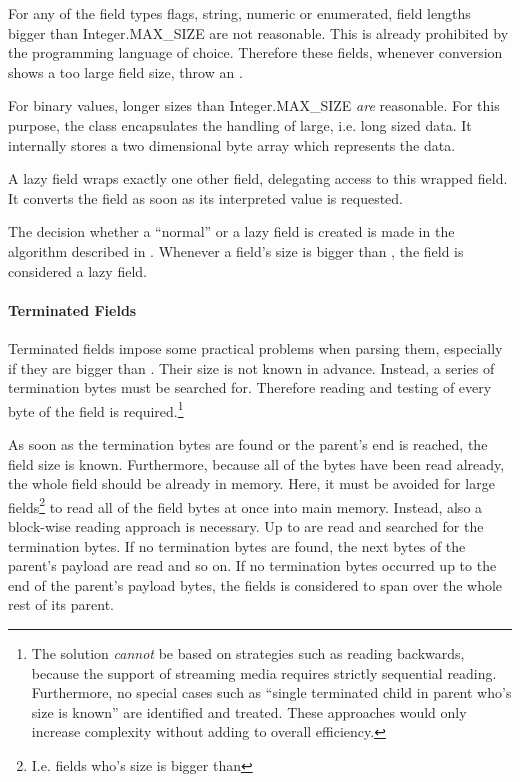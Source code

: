 For any of the field types flags, string, numeric or enumerated, field lengths bigger than Integer.MAX\_SIZE are not reasonable. This is already prohibited by the programming language of choice. Therefore these fields, whenever conversion shows a too large field size, throw an \CLASSfieldSizeOutOfRangeException{}.

For binary values, longer sizes than Integer.MAX\_SIZE \emph{are} reasonable. For this purpose, the \CLASSbinaryValue{} class encapsulates the handling of large, i.e. long sized data. It internally stores a two dimensional byte array which represents the data. 

A lazy field wraps exactly one other field, delegating access to this wrapped field. It converts the field as soon as its interpreted value is requested.

The decision whether a ``normal'' or a lazy field is created is made in the algorithm described in . Whenever a field's size is bigger than \CONSTfieldBlockSize{}, the field is considered a lazy field.


\paragraph{Terminated Fields}
\label{sec:TerminatedFieldsandLargePayload}

Terminated fields impose some practical problems when parsing them, especially if they are bigger than \CONSTfieldBlockSize{}. Their size is not known in advance. Instead, a series of termination bytes must be searched for. Therefore reading and testing of every byte of the field is required.\footnote{The solution \emph{cannot} be based on strategies such as reading backwards, because the support of streaming media requires strictly sequential reading. Furthermore, no special cases such as ``single terminated child in parent who's size is known'' are identified and treated. These approaches would only increase complexity without adding to overall efficiency.}

As soon as the termination bytes are found or the parent's end is reached, the field size is known. Furthermore, because all of the bytes have been read already, the whole field should be already in memory. Here, it must be avoided for large fields\footnote{I.e. fields who's size is bigger than \CONSTfieldBlockSize{}} to read all of the field bytes at once into main memory. Instead, also a block-wise reading approach is necessary. Up to \CONSTfieldBlockSize{} are read and searched for the termination bytes. If no termination bytes are found, the next bytes of the parent's payload are read and so on. If no termination bytes occurred up to the end of the parent's payload bytes, the fields is considered to span over the whole rest of its parent.

